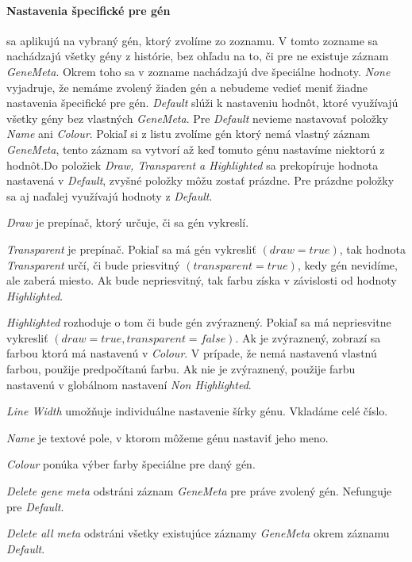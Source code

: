 \paragraph{Nastavenia špecifické pre gén} sa aplikujú na vybraný gén, ktorý zvolíme zo zoznamu.
V tomto zozname sa nachádzajú všetky gény z histórie, bez ohľadu na to, či pre ne existuje záznam \emph{GeneMeta}.
Okrem toho sa v zozname nachádzajú dve špeciálne hodnoty. \emph{None} vyjadruje, že nemáme zvolený žiaden gén a nebudeme vedieť meniť žiadne 
nastavenia špecifické pre gén. \emph{Default} slúži k nastaveniu hodnôt, ktoré využívajú všetky gény bez vlastných \emph{GeneMeta}.
Pre \emph{Default} nevieme nastavovať položky \emph{Name} ani \emph{Colour}.
Pokiaľ si z listu zvolíme gén ktorý nemá vlastný záznam \emph{GeneMeta}, tento záznam sa vytvorí až keď tomuto génu nastavíme niektorú z
hodnôt.Do položiek \emph{Draw, Transparent a Highlighted} sa prekopíruje hodnota nastavená v \emph{Default}, zvyšné položky môžu zostať prázdne.
Pre prázdne položky sa aj naďalej využívajú hodnoty z \emph{Default}.

\emph{Draw} je prepínač, ktorý určuje, či sa gén vykreslí.

\emph{Transparent} je prepínač. Pokiaľ sa má gén vykresliť $(draw=true)$, tak hodnota \emph{Transparent} určí, či bude priesvitný $(transparent=true)$, kedy gén nevidíme, ale zaberá miesto.
Ak bude nepriesvitný, tak farbu získa v závislosti od hodnoty \emph{Highlighted}.

\emph{Highlighted} rozhoduje o tom či bude gén zvýraznený. Pokiaľ sa má nepriesvitne vykresliť $(draw=true,transparent=false)$.
Ak je zvýraznený, zobrazí sa farbou ktorú má nastavenú v \emph{Colour}. V prípade, že nemá nastavenú vlastnú farbou, použije predpočítanú farbu.
Ak nie je zvýraznený, použije farbu nastavenú v globálnom nastavení \emph{Non Highlighted}. 

\emph{Line Width} umožňuje individuálne nastavenie šírky génu. Vkladáme celé číslo.

\emph{Name} je textové pole, v ktorom môžeme génu nastaviť jeho meno.

\emph{Colour} ponúka výber farby špeciálne pre daný gén.

\emph{Delete gene meta} odstráni záznam \emph{GeneMeta} pre práve zvolený gén. Nefunguje pre \emph{Default}.

\emph{Delete all meta} odstráni všetky existujúce záznamy \emph{GeneMeta} okrem záznamu \emph{Default}.

